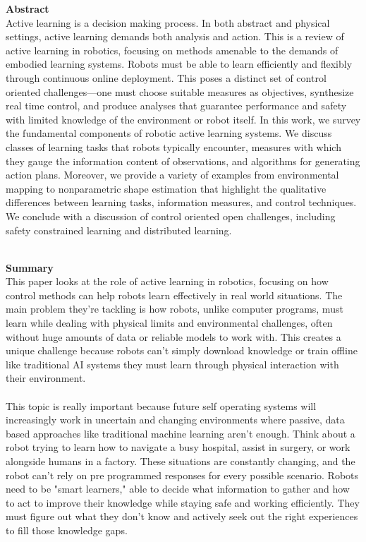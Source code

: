 \documentclass[report.tex]{subfiles}
\begin{document}
\noindent\textbf{Abstract} \\
Active learning is a decision making process. In both abstract and physical settings, active learning demands
both analysis and action. This is a review of active learning in robotics, focusing on methods amenable to
the demands of embodied learning systems. Robots must be able to learn efficiently and flexibly through
continuous online deployment. This poses a distinct set of control oriented challenges—one must choose
suitable measures as objectives, synthesize real time control, and produce analyses that guarantee performance
and safety with limited knowledge of the environment or robot itself. In this work, we survey the fundamental
components of robotic active learning systems. We discuss classes of learning tasks that robots typically
encounter, measures with which they gauge the information content of observations, and algorithms for
generating action plans. Moreover, we provide a variety of examples   from environmental mapping to
nonparametric shape estimation that highlight the qualitative differences between learning tasks, information
measures, and control techniques. We conclude with a discussion of control oriented open challenges, including
safety constrained learning and distributed learning.

\\


\noindent\textbf{Summary} \\
This paper looks at the role of active learning in robotics, focusing on how control methods can help robots learn effectively in real world situations. The main problem they're tackling is how robots, unlike computer programs, must learn while dealing with physical limits and environmental challenges, often without huge amounts of data or reliable models to work with. This creates a unique challenge because robots can't simply download knowledge or train offline like traditional AI systems   they must learn through physical interaction with their environment.\\\\
This topic is really important because future self operating systems will increasingly work in uncertain and changing environments where passive, data based approaches  like traditional machine learning   aren't enough. Think about a robot trying to learn how to navigate a busy hospital, assist in surgery, or work alongside humans in a factory. These situations are constantly changing, and the robot can't rely on pre programmed responses for every possible scenario. Robots need to be "smart learners," able to decide what information to gather and how to act to improve their knowledge while staying safe and working efficiently. They must figure out what they don't know and actively seek out the right experiences to fill those knowledge gaps.
\end{document}
